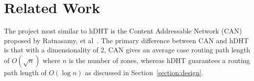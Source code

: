\section{Related Work} \label{section:related-work}
The project most similar to hDHT is the Content Addressable Network (CAN) proposed by Ratnasamy, et al~\cite{ratnasamy2001scalable}. The primary difference between CAN and hDHT is that with a dimensionality of 2, CAN gives an average case routing path length of $O(\sqrt n)$ where $n$ is the number of zones, whereas hDHT guarantees a routing path length of $O(\log n)$ as discussed in Section~\ref{section:design}.
